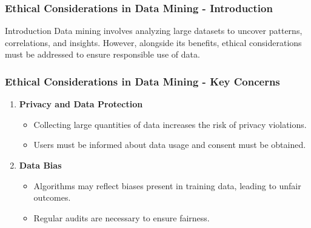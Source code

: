 \documentclass[aspectratio=169]{beamer}
\begin{document}
\begin{frame}[fragile]
    \frametitle{Ethical Considerations in Data Mining - Introduction}
    \begin{block}{Introduction}
        Data mining involves analyzing large datasets to uncover patterns, correlations, and insights. However, alongside its benefits, ethical considerations must be addressed to ensure responsible use of data.
    \end{block}
\end{frame}

\begin{frame}[fragile]
    \frametitle{Ethical Considerations in Data Mining - Key Concerns}
    \begin{enumerate}
        \item \textbf{Privacy and Data Protection}
            \begin{itemize}
                \item Collecting large quantities of data increases the risk of privacy violations.
                \item Users must be informed about data usage and consent must be obtained.
            \end{itemize}
        \item \textbf{Data Bias}
            \begin{itemize}
                \item Algorithms may reflect biases present in training data, leading to unfair outcomes.
                \item Regular audits are necessary to ensure fairness.
            \end{itemize}
    \end{enumerate}
\end{frame}
\end{document}

